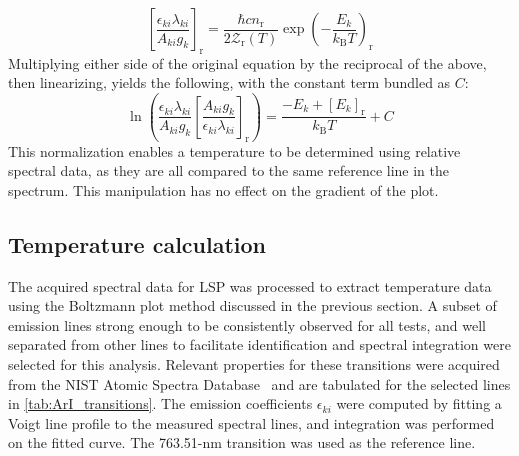            \begin{equation} \label{eq:reference_transition}
                \left[\frac{\epsilon_{ki}\lambda_{ki}}{A_{ki}g_k}\right]_\mathrm{r} = \frac{\hbar cn_\mathrm{r}}{2 \mathcal{Z}_\mathrm{r}(T)}\exp{\left(-\frac{E_k}{k_\mathrm{B}T}\right)_\mathrm{r}}
            \end{equation}
            Multiplying either side of the original equation by the reciprocal of the above, then linearizing, yields the following, with the constant term bundled as $C$:
            \begin{equation}
                \ln{\left(\frac{\epsilon_{ki}\lambda_{ki}}{A_{ki}g_k}\left[\frac{A_{ki}g_k}{\epsilon_{ki}\lambda_{ki}}\right]_\mathrm{r}\right)} = \frac{-E_k+[E_k]_\mathrm{r}}{k_\mathrm{B}T} + C
            \end{equation}
            This normalization enables a temperature to be determined using relative spectral data, as they are all compared to the same reference line in the spectrum. This manipulation has no effect on the gradient of the plot.

        \subsection{Temperature calculation}
            The acquired spectral data for LSP was processed to extract temperature data using the Boltzmann plot method discussed in the previous section. A subset of emission lines strong enough to be consistently observed for all tests, and well separated from other lines to facilitate identification and spectral integration were selected for this analysis. Relevant properties for these transitions were acquired from the NIST Atomic Spectra Database~\cite{kramidaNISTAtomicSpectra2022} and are tabulated for the selected lines in \autoref{tab:ArI_transitions}. The emission coefficients $\epsilon_{ki}$ were computed by fitting a Voigt line profile to the measured spectral lines, and integration was performed on the fitted curve. The \num{763.51}-\unit{nm} transition was used as the reference line.

